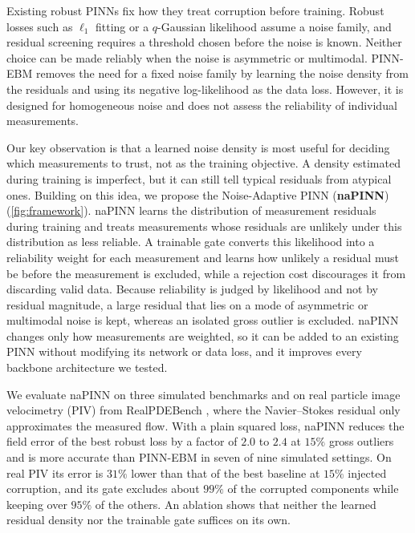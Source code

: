 \documentclass[twoside]{article}
\begin{document}
Existing robust PINNs fix how they treat corruption before training. Robust
losses such as $\ell_1$ fitting \citep{Peng2022} or a $q$-Gaussian likelihood
\citep{Duarte2025} assume a noise family, and residual screening
\citep{Peng2022} requires a threshold chosen before the noise is known. Neither
choice can be made reliably when the noise is asymmetric or multimodal.
PINN-EBM \citep{Pilar2024} removes the need for a fixed noise family by learning
the noise density from the residuals and using its negative log-likelihood as
the data loss. However, it is designed for homogeneous noise and does not assess
the reliability of individual measurements.

Our key observation is that a learned noise density is most useful for deciding
which measurements to trust, not as the training objective. A density estimated
during training is imperfect, but it can still tell typical residuals from
atypical ones. Building on this idea, we propose the Noise-Adaptive PINN
(\textbf{naPINN}) (\cref{fig:framework}). naPINN learns the distribution of
measurement residuals during training and treats measurements whose residuals
are unlikely under this distribution as less reliable. A trainable gate
converts this likelihood into a reliability weight for each measurement and
learns how unlikely a residual must be before the measurement is excluded,
while a rejection cost discourages it from discarding valid data. Because
reliability is judged by likelihood and not by residual magnitude, a large
residual that lies on a mode of asymmetric or multimodal noise is kept, whereas
an isolated gross outlier is excluded.
naPINN changes only how measurements are weighted, so it can be added to an
existing PINN without modifying its network or data loss, and it improves every
backbone architecture we tested.

We evaluate naPINN on three simulated benchmarks and on real particle image
velocimetry (PIV) from RealPDEBench \citep{hu2026realpdebench}, where the
Navier--Stokes residual only approximates the measured flow. With a plain
squared loss, naPINN reduces the field error of the best robust loss by a factor
of $2.0$ to $2.4$ at $15\%$ gross outliers and is more accurate than PINN-EBM in
seven of nine simulated settings. On real PIV its error is $31\%$ lower than
that of the best baseline at $15\%$ injected corruption, and its gate excludes
about $99\%$ of the corrupted components while keeping over $95\%$ of the
others. An ablation shows that neither the learned residual density nor the trainable
gate suffices on its own.
\end{document}
